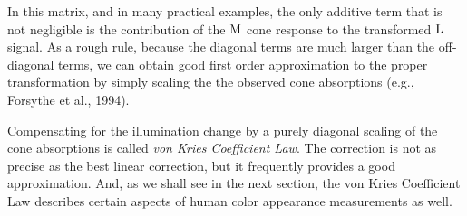 In this matrix, and in many practical examples, the only additive term
that is not negligible is the contribution of the $\mbox{M}$ cone
response to the transformed $\mbox{L}$ signal.  As a rough rule, because
the diagonal terms are much larger than the off-diagonal terms, we can
obtain good first order approximation to the proper transformation by
simply scaling the the observed cone absorptions (e.g., Forsythe et al., 1994).

Compensating for the illumination change by a purely diagonal scaling
of the cone absorptions is called {\em von Kries Coefficient Law}.
The correction is not as precise as the best linear correction, but it
frequently provides a good approximation.  And, as we shall see in the
next section, the von Kries Coefficient Law describes certain aspects of
human color appearance measurements as well.

